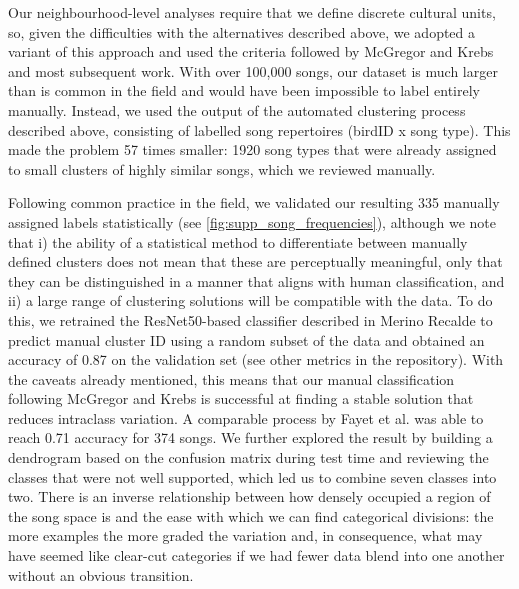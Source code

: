 Our neighbourhood-level analyses require that we define discrete cultural units, so, given the difficulties with the alternatives described above, we adopted a variant of this approach and used the criteria followed by McGregor and Krebs \textcite{mcgregor1982b} and most subsequent work. With over 100,000 songs, our dataset is much larger than is common in the field and would have been impossible to label entirely manually. Instead, we used the output of the automated clustering process described above, consisting of labelled song repertoires (birdID x song type). This made the problem 57 times smaller: 1920 song types that were already assigned to small clusters of highly similar songs, which we reviewed manually.

Following common practice in the field, we validated our resulting 335 manually assigned labels statistically (see \autoref{fig:supp_song_frequencies}), although we note that i) the ability of a statistical method to differentiate between manually defined clusters does not mean that these are perceptually meaningful, only that they can be distinguished in a manner that aligns with human classification, and ii) a large range of clustering solutions will be compatible with the data. To do this, we retrained the ResNet50-based classifier described in Merino Recalde \textcite{merinorecalde2023} to predict manual cluster ID using a random subset of the data and obtained an accuracy of 0.87 on the validation set (see other metrics in the repository). With the caveats already mentioned, this means that our manual classification following McGregor and Krebs \textcite{mcgregor1982b} is successful at finding a stable solution that reduces intraclass variation. A comparable process by Fayet et al. \textcite{fayet2014} was able to reach 0.71 accuracy for 374 songs. We further explored the result by building a dendrogram based on the confusion matrix during test time and reviewing the classes that were not well supported, which led us to combine seven classes into two. There is an inverse relationship between how densely occupied a region of the song space is and the ease with which we can find categorical divisions: the more examples the more graded the variation and, in consequence, what may have seemed like clear-cut categories if we had fewer data blend into one another without an obvious transition.

